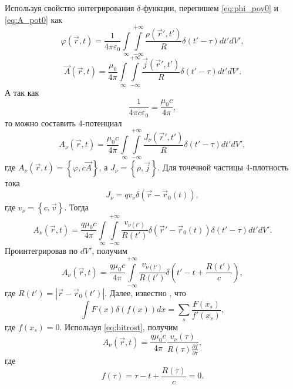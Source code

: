 Используя свойство интегрирования $\delta$-функции, перепишем \eqref{eq:phi_poy0} и \eqref{eq:A_pot0} как
\begin{equation}
\varphi(\vec{r},t) = \frac{1}{4 \pi \varepsilon_0} \int \limits_{\infty}  \int \limits^{+\infty}_{- \infty}  \frac{\rho(\vec{r}',t')}{R} \delta(t' - \tau) dt' dV',
\end{equation}
\begin{equation}
\vec{A}(\vec{r},t) = \frac{\mu_0}{4 \pi} \int \limits_{\infty}  \int \limits^{+\infty}_{- \infty}  \frac{\vec{j}(\vec{r}',t')}{R} \delta(t' - \tau) dt' dV'.
\end{equation}
А так как
\begin{equation}
\frac{1}{4 \pi c \varepsilon_0} = \frac{\mu_0 c}{4 \pi},
\end{equation}
то можно составить 4-потенциал
\begin{equation}
A_{\nu} (\vec{r},t) = \frac{\mu_0c}{4\pi} \int \limits_{\infty}  \int \limits^{+\infty}_{- \infty} \frac{J_{\nu} (\vec{r}',t') }{R} \delta (t' - \tau) dt' dV',
\end{equation}
где $A_{\nu} (\vec{r},t) = \left\{ \varphi , c\vec{A} \right\}$, а $J_{\nu} = \left\{  \rho, \vec{j} \right\}$. Для точечной частицы 4-плотность тока
\begin{equation}
J_{\nu} = q v_{\nu} \delta \left( \vec{r} - \vec{r}_0(t)  \right),
\end{equation}
где $v_{\nu} = \left\{ c, \vec{v}  \right\}$. Тогда 
\begin{equation}
A_{\nu} (\vec{r} , t) = \frac{q \mu_0c}{4\pi} \int \limits_{\infty} \int \limits_{- \infty}^{+\infty}  \frac{v_{\nu(t')}}{R(t')} \delta (\vec{r}' - \vec{r}_0(t)) \delta \left(  t' - \tau  \right) dt' dV'.
\end{equation}
Проинтегрировав по $dV'$, получим
\begin{equation}
A_{\nu} (\vec{r} , t) = \frac{q \mu_0c}{4\pi} \int \limits_{- \infty}^{+\infty} \frac{v_{\nu(t')}}{R(t')} \delta \left( t' - t + \frac{R(t')}{c} \right),
\end{equation}
где $R(t') = \left| \vec{r} - \vec{r}_0(t') \right|$. Далее, известно \cite{Landau2}, что
\begin{equation}
\int F(x) \delta \left( f(x) \right) dx = \sum_s \frac{F(x_s)}{f'(x_s)},
\label{eq:hitrost}
\end{equation} 
где $f(x_s) = 0$. Используя \eqref{eq:hitrost}, получим
\begin{equation}
A_{\nu} (\vec{r},t) = \frac{q \mu_0c}{4\pi} \frac{v_{\nu}(\tau)}{R(\tau) \frac{\partial f}{\partial \tau}},
\label{eq:almost_pot}
\end{equation}
где
\begin{equation}
f(\tau) = \tau - t + \frac{R(\tau)}{c} = 0.
\end{equation}

